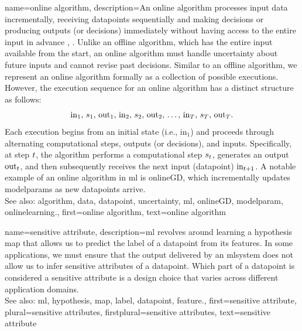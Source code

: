 {name={online algorithm},
	description={An online \gls{algorithm} processes input \gls{data} incrementally, 
		receiving \glspl{datapoint} sequentially and making decisions or producing \glspl{output} (or decisions) immediately 
		without having access to the entire input in advance \cite{PredictionLearningGames}, \cite{HazanOCO}. 
		Unlike an offline \gls{algorithm}, which has the entire input available from the start, an online \gls{algorithm} 
		must handle \gls{uncertainty} about future inputs and cannot revise past decisions. Similar to an 
		offline \gls{algorithm}, we represent an online \gls{algorithm} formally as a collection of possible 
		executions. However, the execution \gls{sequence} for an online \gls{algorithm} has a distinct structure as follows:
		$${\rm in}_{1}, \,s_1, \,{\rm out}_{1}, \,{\rm in}_{2}, \,s_2, \,{\rm out}_{2}, \,\ldots, \,{\rm in}_{T}, \,s_T, \,{\rm out}_{T}.$$ 
		Each execution begins from an initial state (i.e., \(\text{in}_{1}\)) and proceeds through alternating 
		computational steps, \glspl{output} (or decisions), and inputs. Specifically, at step \(t\), 
		the \gls{algorithm} performs a computational step \(s_{t}\), generates an \gls{output} \(\text{out}_{t}\), 
		and then subsequently receives the next input (\gls{datapoint}) \(\text{in}_{t+1}\). A 
		notable example of an online \gls{algorithm} in \gls{ml} is \gls{onlineGD}, which incrementally 
		updates \glspl{modelparam} as new \glspl{datapoint} arrive. 
					\\ 
		See also: \gls{algorithm}, \gls{data}, \gls{datapoint}, \gls{uncertainty}, \gls{ml}, \gls{onlineGD}, \gls{modelparam}, \gls{onlinelearning}.},
	first={online algorithm},
	text={online algorithm} 
}

{name={sensitive attribute},
	description={\gls{ml} revolves around learning a \gls{hypothesis} \gls{map} that allows 
		us to predict the \gls{label} of a \gls{datapoint} from its \glspl{feature}. In some 
		applications, we must ensure that the \gls{output} delivered by an \gls{mlsystem} does 
		not allow us to infer sensitive attributes of a \gls{datapoint}. Which part 
		of a \gls{datapoint} is considered a sensitive attribute is a design 
		choice that varies across different application domains.
					\\ 
		See also: \gls{ml}, \gls{hypothesis}, \gls{map}, \gls{label}, \gls{datapoint}, \gls{feature}.},
	first={sensitive attribute},
	plural={sensitive attributes},
	firstplural={sensitive attributes},
	text={sensitive attribute} 
}

